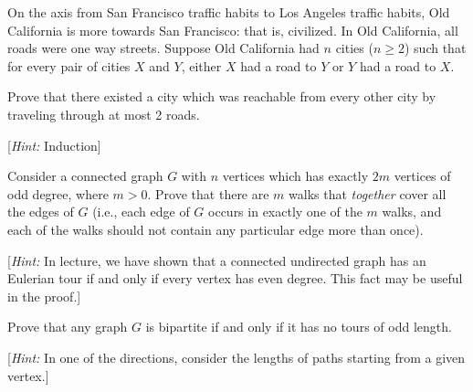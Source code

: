 \documentclass[11pt]{article}
\begin{document}

\begin{Parts}

\Part On the axis from San Francisco traffic habits to Los Angeles traffic habits, Old California is more towards San Francisco: that is, civilized. In Old California, all roads were one way streets. Suppose Old California had 
$n$ cities ($n \geq 2$) such that for every pair of cities $X$ and $Y$,
either $X$ had a road to $Y$ or $Y$ had a road to $X$.

Prove that there existed a city which was reachable from every other city by traveling through at most 2 roads. 

[\textit{Hint:} Induction]

\Part Consider a connected graph $G$ with $n$ vertices which has exactly $2m$ vertices of
odd degree, where $m > 0$. Prove that there are $m$ walks that \emph{together} 
cover all the edges of $G$ (i.e., each edge of $G$ occurs in exactly one of the $m$ walks, 
and each of the walks should not contain any particular edge more than once).

[\emph{Hint:} In lecture, we have shown that a connected undirected graph has an Eulerian tour if and only if every vertex has even degree. This fact may be useful in the proof.]

\Part Prove that any graph $G$ is bipartite if and only if it has no tours of odd length.

[\emph{Hint:} In one of the directions, consider the lengths of paths starting from a given vertex.]
\end{Parts}
\end{document}
